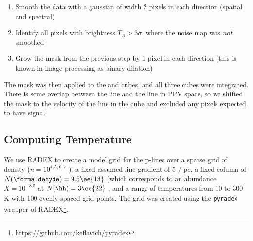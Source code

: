 \begin{enumerate}
    \item Smooth the data with a gaussian of width 2 pixels in each direction
        (spatial and spectral)
    \item Identify all pixels with brightness $T_A > 3\sigma$, where the noise
        map was \emph{not} smoothed
    \item Grow the mask from the previous step by 1 pixel in each direction
        (this is known in image processing as binary dilation)
\end{enumerate}

The \formaldehyde \threeohthree mask was then applied to the \threetwoone and
\threetwotwo cubes, and all three cubes were integrated.  There is some overlap
between the \methanol \fourtwotwo line and the \formaldehyde \threetwotwo
line in PPV space, so we shifted the \formaldehyde mask to the velocity of the
\methanol line in the \formaldehyde \threetwotwo cube and excluded any pixels
expected to have signal.


\subsection{Computing Temperature}
\label{sec:formaldehydetemmap}
We use RADEX \citet{van-Der-Tak2007a} to create a model grid for the
p-\formaldehyde lines over a sparse grid of density ($n=10^{4,5,6,7}$ \percc),
a fixed assumed line gradient of 5 \kms / pc, a fixed column of \formaldehyde
$N(\formaldehyde) = 9.5\ee{13}$ \persc (which corresponds to an abundance
$X=10^{-8.5}$ at $N(\hh) = 3\ee{22}$ \persc, and a range of temperatures from
10 to 300 K with 100 evenly spaced grid points.  The grid was created using
the \texttt{pyradex} wrapper of
RADEX\footnote{\url{https://github.com/keflavich/pyradex}}.


